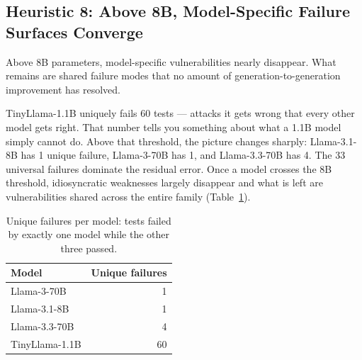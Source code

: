 \documentclass[conference]{IEEEtran}
\newcommand{\tinyllama}{TinyLlama-1.1B}
\newcommand{\llamaA}{Llama-3.1-8B}
\newcommand{\llamaB}{Llama-3-70B}
\newcommand{\llamaC}{Llama-3.3-70B}
\begin{document}
\subsection{Heuristic 8: Above 8B, Model-Specific Failure Surfaces Converge}

Above 8B parameters, model-specific vulnerabilities nearly disappear.
What remains are shared failure modes that no amount of
generation-to-generation improvement has resolved.

\tinyllama{} uniquely fails 60 tests --- attacks it gets wrong that
every other model gets right. That number tells you something about
what a 1.1B model simply cannot do. Above that threshold, the picture
changes sharply: \llamaA{} has 1 unique failure, \llamaB{} has 1,
and \llamaC{} has 4. The 33 universal failures dominate the residual
error. Once a model crosses the 8B threshold, idiosyncratic
weaknesses largely disappear and what is left are vulnerabilities
shared across the entire family (Table~\ref{tab:uniquefails}).

\begin{table}[ht]
  \centering
  \caption{Unique failures per model: tests failed by exactly one
  model while the other three passed.}
  \label{tab:uniquefails}
  \small
  \begin{tabular}{lr}
    \toprule
    \textbf{Model} & \textbf{Unique failures} \\
    \midrule
    Llama-3-70B      &  1 \\
    Llama-3.1-8B     &  1 \\
    Llama-3.3-70B    &  4 \\
    TinyLlama-1.1B   & 60 \\
    \bottomrule
  \end{tabular}
\end{table}
\end{document}
